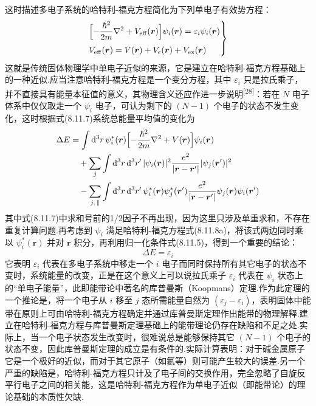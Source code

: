 这时描述多电子系统的哈特利-福克方程简化为下列单电子有效势方程：
\begin{equation}
  \left.
  \begin{aligned}
    &\Bigl[-\frac{\hbar^{2}}{2m}\nabla^{2}+V_{\mathrm{eff}}(\boldsymbol{r})\Bigr]\psi_{i}(\boldsymbol{r})
    =\varepsilon_{i}\psi_{i}(\boldsymbol{r})\\[0.3em]
    &V_{\mathrm{eff}}(\boldsymbol{r})=V(\boldsymbol{r})+V_{\mathrm{c}}(\boldsymbol{r})+V_{\mathrm{ex}}(\boldsymbol{r})
  \end{aligned}\right\}
\end{equation}
这就是传统固体物理学中单电子近似的来源，它是建立在哈特利-福克方程基础上的一种近似.应当注意哈特利-福克方程是一个变分方程，其中 $\varepsilon_{i}$ 只是拉氏乘子，并不直接具有能量本征值的意义，其物理含义还应作进一步说明\textsuperscript{[28]}：若在 $N$ 电子体系中仅仅取走一个 $\psi_{i}$ 电子，可认为剩下的 $(N-1)$ 个电子的状态不发生变化，这时根据式(8.11.7)系统总能量平均值的变化为
\begin{equation}
\begin{aligned}
  \Delta E&=\int\mathrm{d}^{3}r\,\psi_{i}^{*}(\boldsymbol{r})
  \Bigl[-\frac{\hbar^{2}}{2m}\nabla^{2}+V(\boldsymbol{r})\Bigr]\psi_{i}(\boldsymbol{r})\\
  &\quad+\sum_{j}\int\mathrm{d}^{3}r\,\mathrm{d}^{3}r'\,|\psi_{i}(\boldsymbol{r})|^{2}
  \frac{e^{2}}{|\boldsymbol{r}-\boldsymbol{r}'|}|\psi_{j}(\boldsymbol{r}')|^{2}\\
  &\quad-\sum_{j,\,\parallel}\int\mathrm{d}^{3}r\,\mathrm{d}^{3}r'\,
  \psi_{i}^{*}(\boldsymbol{r})\psi_{j}^{*}(\boldsymbol{r}')
  \frac{e^{2}}{|\boldsymbol{r}-\boldsymbol{r}'|}\psi_{j}(\boldsymbol{r})\psi_{i}(\boldsymbol{r}')
\end{aligned}
\end{equation}
其中式(8.11.7)中求和号前的1/2因子不再出现，因为这里只涉及单重求和，不存在重复计算问题.再考虑到 $\psi_{i}$ 满足哈特利-福克方程式(8.11.8a)，将该式两边同时乘以 $\psi_{i}^{*}(\boldsymbol{r})$ 并对 $\boldsymbol{r}$ 积分，再利用归一化条件式(8.11.5)，得到一个重要的结论：
\begin{equation}
  \Delta E=\varepsilon_{i}
\end{equation}
它表明 $\varepsilon_{i}$ 代表在多电子系统中移走一个 $i$ 电子而同时保持所有其它电子的状态不变时，系统能量的改变，正是在这个意义上可以说拉氏乘子 $\varepsilon_{i}$ 代表在 $\psi_{i}$ 状态上的“单电子能量”，此即能带论中著名的库普曼斯（Koopmans）定理.作为此定理的一个推论是，将一个电子从 $i$ 移至 $j$ 态所需能量自然为 $(\varepsilon_{j}-\varepsilon_{i})$，表明固体中能带在原则上可由哈特利-福克方程确定并通过库普曼斯定理作出能带的物理解释.建立在哈特利-福克方程与库普曼斯定理基础上的能带理论仍存在缺陷和不足之处.实际上，当一个电子状态发生改变时，很难说总是能够保持其它 $(N-1)$ 个电子的状态不变，因此库普曼斯定理的成立是有条件的.实际计算表明：对于碱金属原子它是一个极好的近似，而对于其它原子（如氦等）则可能产生较大的误差.另一个严重的缺陷是，哈特利-福克方程只计及了电子间的交换作用，完全忽略了自旋反平行电子之间的相关能，这是哈特利-福克方程作为单电子近似（即能带论）的理论基础的本质性欠缺.


